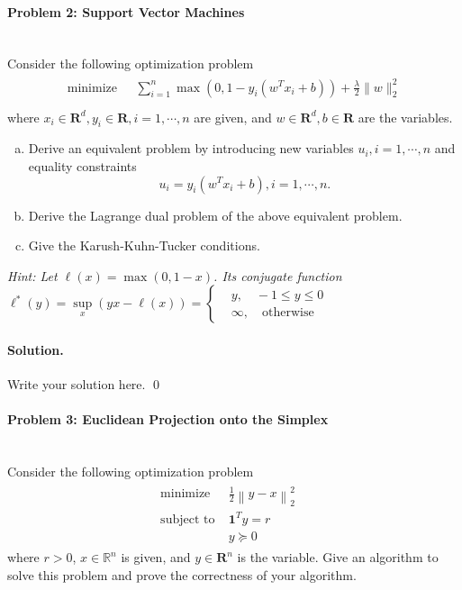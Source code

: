 \documentclass[a4paper]{article}
\newenvironment{solution}
{\color{blue} \paragraph{Solution.}}
{\newline \qed}
\begin{document}
\paragraph{Problem 2: Support Vector Machines}
~\\
Consider the following optimization problem
\begin{gather*}
\begin{matrix}
\text{minimize~~} & \sum_{i=1}^n\max\left(0,1-y_i(w^Tx_i+b)\right)+\frac{\lambda}{2}\|w\|_2^2\\
\end{matrix}
\end{gather*}
where $x_i\in\mathbf{R}^{d},y_i\in \mathbf{R},i=1,\cdots,n$ are given, and $w\in \mathbf{R}^d,b\in\mathbf{R}$ are the variables.
\begin{enumerate}[a)]
    \item Derive an equivalent problem by introducing new variables $u_i,i=1,\cdots,n$ and equality constraints \[u_i=y_i(w^Tx_i+b),i=1,\cdots,n.\]
    \item Derive the Lagrange dual problem of the above equivalent problem.
    \item Give the Karush-Kuhn-Tucker conditions.
\end{enumerate}

\noindent\emph{Hint: Let $\ell(x)=\max(0,1-x)$. Its conjugate function $\ell^\ast(y)=\sup\limits_{x}(yx-\ell(x))=\left\{
\begin{aligned}
&y, \quad-1\leq y\leq0 \\
&\infty,\quad\text{otherwise}
\end{aligned}
\right.$}
\begin{solution}
Write your solution here.
\end{solution}

\paragraph{Problem 3: Euclidean Projection onto the Simplex}
~\\
Consider the following optimization problem
\begin{gather*}
\begin{matrix}
\text{minimize~~} & \frac{1}{2}\left\|y-x\right\|^2_2\quad\\
\text{subject to} & \mathbf{1}^Ty=r\quad\quad\\
&y\succeq0\quad\quad\quad
\end{matrix}
\end{gather*}
where $r>0$, $x\in \mathbb{R}^n$ is given, and $y\in \mathbf{R}^n$ is the variable. Give an algorithm to solve this problem and prove the correctness of your algorithm.
\end{document}
